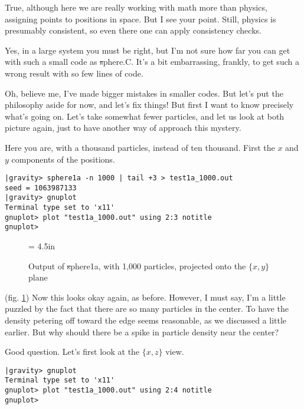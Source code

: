 \bob
True, although here we are really working with math more than physics,
assigning points to positions in space.  But I see your point.  Still,
physics is presumably consistent, so even there one can apply
consistency checks.

\carol
Yes, in a large system you must be right, but I'm not sure how far you
can get with such a small code as {\st sphere.C}.  It's a bit
embarrassing, frankly, to get such a wrong result with so few lines of
code.

\alice
Oh, believe me, I've made bigger mistakes in smaller codes.  But let's
put the philosophy aside for now, and let's fix things!  But first I
want to know precisely what's going on.  Let's take somewhat fewer
particles, and let us look at both picture again, just to have
another way of approach this mystery.

\carol
Here you are, with a thousand particles, instead of ten thousand.
First the $x$ and $y$ components of the positions.

\cba

\begin{small}
\begin{verbatim}
|gravity> sphere1a -n 1000 | tail +3 > test1a_1000.out
seed = 1063987133
|gravity> gnuplot
Terminal type set to 'x11'
gnuplot> plot "test1a_1000.out" using 2:3 notitle
gnuplot>
\end{verbatim}
\end{small}

\begin{figure}[htb]
\begin{center}
\epsfxsize = 4.5in
\caption[xy plot of {\st sphere1a} output]
{Output of {\st sphere1a}, with 1,000 particles, projected onto the
$\{x,y\}$ plane}
\label{fig:sphere1axy1000}
\end{center}
\end{figure}

\abc

\bob
(fig. \ref{fig:sphere1axy1000}) 
Now this looks okay again, as before.  However, I must say, I'm a
little puzzled by the fact that there are so many particles in the
center.  To have the density petering off toward the edge seems
reasonable, as we discussed a little earlier.  But why should there be
a spike in particle density near the center?

\carol
Good question.  Let's first look at the $\{x,z\}$ view.

\cba

\begin{small}
\begin{verbatim}
|gravity> gnuplot
Terminal type set to 'x11'
gnuplot> plot "test1a_1000.out" using 2:4 notitle
gnuplot>
\end{verbatim}
\end{small}

